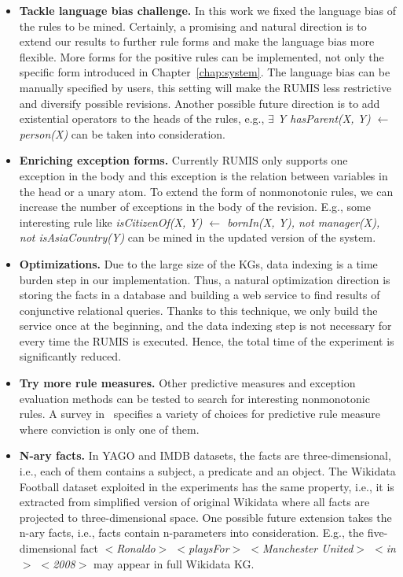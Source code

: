 \begin{itemize}
\item \textbf{Tackle language bias challenge.} In this work we fixed the language bias of the rules to be mined. Certainly, a promising and natural direction is to extend our results to further rule forms and make the language bias more flexible. More forms for the positive rules can be implemented, not only the specific form introduced in Chapter~\ref{chap:system}. The language bias can be manually specified by users, this setting will make the RUMIS less restrictive and diversify possible revisions. Another possible future direction is to add existential operators to the heads of the rules, e.g., \textit{$\exists$ Y hasParent(X, Y) $\leftarrow$ person(X)} can be taken into consideration.
\item \textbf{Enriching exception forms.} Currently RUMIS only supports one exception in the body and this exception is the relation between variables in the head or a unary atom. To extend the form of nonmonotonic rules, we can increase the number of exceptions in the body of the revision. E.g., some interesting rule like \textit{isCitizenOf(X, Y) $\leftarrow$ bornIn(X, Y), not manager(X), not isAsiaCountry(Y)} can be mined in the updated version of the system.
\item \textbf{Optimizations.} Due to the large size of the KGs, data indexing is a time burden step in our implementation. Thus, a natural optimization direction is storing the facts in a database and building a web service to find results of conjunctive relational queries. Thanks to this technique, we only build the service once at the beginning, and the data indexing step is not necessary for every time the RUMIS is executed. Hence, the total time of the experiment is significantly reduced.
\item \textbf{Try more rule measures.} Other predictive measures and exception evaluation methods can be tested to search for interesting nonmonotonic rules. A survey in~\cite{ref46} specifies a variety of choices for predictive rule measure where conviction is only one of them.
\item \textbf{N-ary facts.} In YAGO and IMDB datasets, the facts are three-dimensional, i.e., each of them contains a subject, a predicate and an object. The Wikidata Football dataset exploited in the experiments has the same property, i.e., it is extracted from simplified version of original Wikidata where all facts are projected to three-dimensional space. One possible future extension takes the n-ary facts, i.e., facts contain n-parameters into consideration. E.g., the five-dimensional fact \textit{$<$Ronaldo$>$ $<$playsFor$>$ $<$Manchester United$>$ $<$in$>$ $<$2008$>$} may appear in full Wikidata KG.

\end{itemize}
